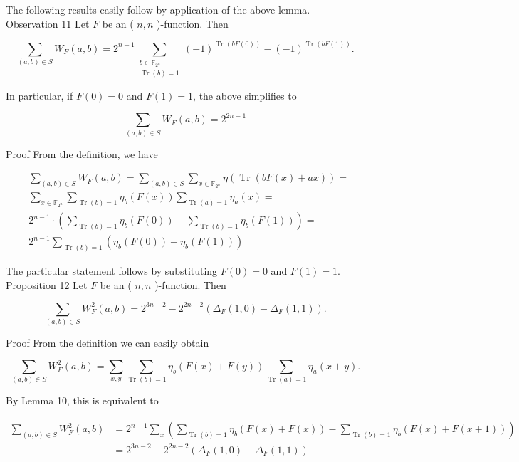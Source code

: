\documentclass[10pt]{article}
\begin{document}
The following results easily follow by application of the above lemma.\\
Observation 11 Let $F$ be an ( $n, n$ )-function. Then

$$
\sum_{(a, b) \in S} W_{F}(a, b)=2^{n-1} \sum_{\substack{b \in \mathbb{F}_{2^{n}} \\ \operatorname{Tr}(b)=1}}(-1)^{\operatorname{Tr}(b F(0))}-(-1)^{\operatorname{Tr}(b F(1))} .
$$

In particular, if $F(0)=0$ and $F(1)=1$, the above simplifies to


\begin{equation*}
\sum_{(a, b) \in S} W_{F}(a, b)=2^{2 n-1} \tag{15}
\end{equation*}


Proof From the definition, we have


\begin{align*}
& \sum_{(a, b) \in S} W_{F}(a, b)= \sum_{(a, b) \in S} \sum_{x \in \mathbb{F}_{2^{n}}} \eta(\operatorname{Tr}(b F(x)+a x))= \\
& \sum_{x \in \mathbb{F}_{2^{n}}} \sum_{\operatorname{Tr}(b)=1} \eta_{b}(F(x)) \sum_{\operatorname{Tr}(a)=1} \eta_{a}(x)= \\
& 2^{n-1} \cdot\left(\sum_{\operatorname{Tr}(b)=1} \eta_{b}(F(0))-\sum_{\operatorname{Tr}(b)=1} \eta_{b}(F(1))\right)=  \tag{16}\\
& 2^{n-1} \sum_{\operatorname{Tr}(b)=1}\left(\eta_{b}(F(0))-\eta_{b}(F(1))\right)
\end{align*}


The particular statement follows by substituting $F(0)=0$ and $F(1)=1$.\\
Proposition 12 Let $F$ be an ( $n, n$ )-function. Then


\begin{equation*}
\sum_{(a, b) \in S} W_{F}^{2}(a, b)=2^{3 n-2}-2^{2 n-2}\left(\Delta_{F}(1,0)-\Delta_{F}(1,1)\right) . \tag{17}
\end{equation*}


Proof From the definition we can easily obtain


\begin{equation*}
\sum_{(a, b) \in S} W_{F}^{2}(a, b)=\sum_{x, y} \sum_{\operatorname{Tr}(b)=1} \eta_{b}(F(x)+F(y)) \sum_{\operatorname{Tr}(a)=1} \eta_{a}(x+y) . \tag{18}
\end{equation*}


By Lemma 10, this is equivalent to


\begin{align*}
\sum_{(a, b) \in S} W_{F}^{2}(a, b) & =2^{n-1} \sum_{x}\left(\sum_{\operatorname{Tr}(b)=1} \eta_{b}(F(x)+F(x))-\sum_{\operatorname{Tr}(b)=1} \eta_{b}(F(x)+F(x+1))\right) \\
& =2^{3 n-2}-2^{2 n-2}\left(\Delta_{F}(1,0)-\Delta_{F}(1,1)\right) \tag{19}
\end{align*}
\end{document}
